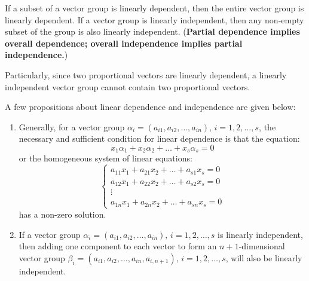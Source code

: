 \documentclass[11pt]{../../TexTemplate/elegantbook} %
\begin{document}
\begin{note}
    If a subset of a vector group is linearly dependent, then the entire vector group is linearly dependent.
    If a vector group is linearly independent, then any non-empty subset of the group is also linearly independent.
    (\textbf{Partial dependence implies overall dependence; overall independence implies partial independence.})
    
    Particularly, since two proportional vectors are linearly dependent, a linearly independent vector group cannot contain two proportional vectors.
\end{note}

A few propositions about linear dependence and independence are given below:
\begin{proposition}
\begin{enumerate}
    \item Generally, for a vector group \( \alpha_i = (a_{i1}, a_{i2}, \dots, a_{in}), \, i = 1, 2, \dots, s \), 
        the necessary and sufficient condition for linear dependence is that the equation:
        \[
        x_1 \alpha_1 + x_2 \alpha_2 + \dots + x_s \alpha_s = 0
        \]
        or the homogeneous system of linear equations:
        \[
        \begin{cases}
        a_{11}x_1 + a_{21}x_2 + \dots + a_{s1}x_s = 0 \\
        a_{12}x_1 + a_{22}x_2 + \dots + a_{s2}x_s = 0 \\
        \vdots \\
        a_{1n}x_1 + a_{2n}x_2 + \dots + a_{sn}x_s = 0
        \end{cases}
        \]
        has a non-zero solution.

    \item  If a vector group \( \alpha_i = (a_{i1}, a_{i2}, \dots, a_{in}), \, i = 1, 2, \dots, s \) 
        is linearly independent, then adding one component to each vector to form an \( n+1 \)-dimensional 
        vector group \( \beta_i = (a_{i1}, a_{i2}, \dots, a_{in}, a_{i,n+1}), \, i = 1, 2, \dots, s \), 
        will also be linearly independent.


\end{enumerate}
\end{proposition}
\end{document}
